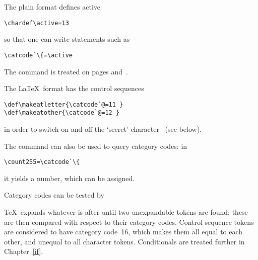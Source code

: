 \documentclass{book}
\begin{document}
The plain format defines
\csterm active\par
\begin{verbatim}
\chardef\active=13
\end{verbatim} 
so that one can write statements such as
\begin{verbatim}
\catcode`\{=\active
\end{verbatim}
The  command is  treated
on pages \pageref{chardef} and~\pageref{num:chardef}.

The \LaTeX\ format has the control sequences
\begin{verbatim}
\def\makeatletter{\catcode`@=11 }
\def\makeatother{\catcode`@=12 }
\end{verbatim}
in order to switch on and off the `secret' character~\n@
(see below).

The  command can also be used to query category
codes: in 
\begin{verbatim}
\count255=\catcode`\{
\end{verbatim}
it yields a number, which can be assigned.

Category codes can be tested by
\begin{disp}\end{disp}
\TeX\ expands whatever is after  until two 
unexpandable tokens are found; these are then compared
with respect to their category codes. Control sequence
tokens are considered to have category code~16,
which makes them all equal to each other, and unequal to
all character tokens.
Conditionals are treated further in Chapter~\ref{if}.
\end{document}
